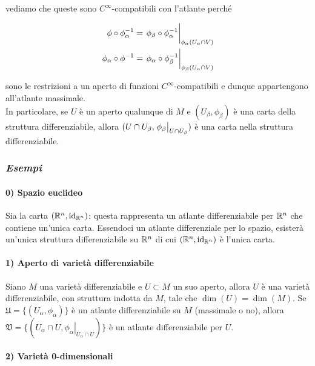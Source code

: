 vediamo che queste sono $ C^{\infty} $-compatibili con l'atlante perché

\begin{align}
	\phi \circ \phi_{\alpha}^{-1} = \eval{\phi_{\beta} \circ \phi_{\alpha}^{-1}}_{\phi_{\alpha}(U_{\alpha} \cap V)}\\
	\phi_{\alpha} \circ \phi^{-1} = \eval{\phi_{\alpha} \circ \phi_{\beta}^{-1}}_{\phi_{\beta}(U_{\alpha} \cap V)}
\end{align}

sono le restrizioni a un aperto di funzioni $ C^{\infty} $-compatibili e dunque appartengono all'atlante massimale.\\
In particolare, se $ U $ è un aperto qualunque di $ M $ e $ (U_{\beta},\phi_{\beta}) $ è una carta della struttura differenziabile, allora $ (U \cap U_{\beta}, \eval{\phi_{\beta}}_{U \cap U_{\beta}}) $ è una carta nella struttura differenziabile.

\subsubsection{\textit{Esempi}}

\paragraph{0) Spazio euclideo}

Sia la carta $ (\mathbb{R}^{n},\operatorname{id}_{\mathbb{R}^{n}}) $: questa rappresenta un atlante differenziabile per $ \mathbb{R}^{n} $ che contiene un'unica carta. Essendoci un atlante differenziale per lo spazio, esisterà un'unica struttura differenziabile su $ \mathbb{R}^{n} $ di cui $ (\mathbb{R}^{n},\operatorname{id}_{\mathbb{R}^{n}}) $ è l'unica carta.

\paragraph{1) Aperto di varietà differenziabile}

Siano $ M $ una varietà differenziabile e $ U \subset M $ un suo aperto, allora $ U $ è una varietà differenziabile, con struttura indotta da $ M $, tale che $ \dim (U) = \dim (M) $. Se $ \mathfrak{U} = \{(U_{\alpha},\phi_{\alpha})\} $ è un atlante differenziabile su $ M $ (massimale o no), allora $ \mathfrak{V} = \{(U_{\alpha} \cap U,\left. \phi_{\alpha} \right|_{U_{\alpha} \cap U})\} $ è un atlante differenziabile per $ U $.

\paragraph{2) Varietà 0-dimensionali}


